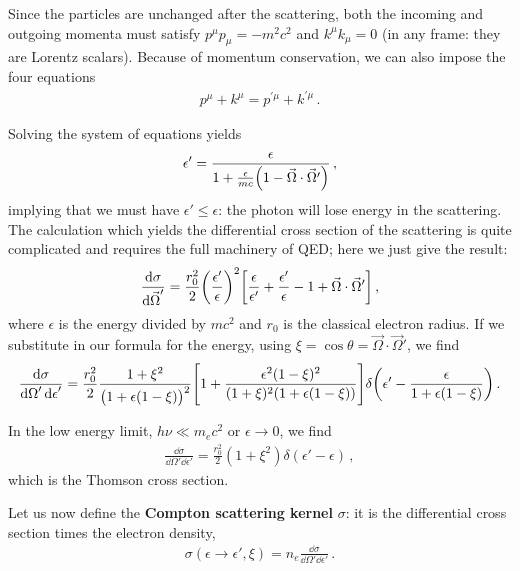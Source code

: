 \documentclass[main.tex]{subfiles}
\begin{document}
Since the particles are unchanged after the scattering, both the incoming and outgoing momenta must satisfy \(p^{\mu } p_{\mu } = - m^2 c^2\) and \(k^{\mu } k_{\mu } = 0\) (in any frame: they are Lorentz scalars). 
Because of momentum conservation, we can also impose the four equations 
%
\begin{align}
p^{\mu } + k^{\mu } = p^{\prime \mu } + k^{\prime \mu }
\,.
\end{align}

Solving the system of equations yields 
%
\begin{align}
\epsilon' = \frac{\epsilon }{1 + \frac{\epsilon }{mc} \qty(1 - \vec{\Omega} \cdot \vec{\Omega}')}
\,,
\end{align}
%
implying that we must have \(\epsilon' \leq \epsilon \): the photon will lose energy in the scattering. 
The calculation which yields the differential cross section of the scattering is quite complicated and requires the full machinery of QED; here we just give the result: 
%
\begin{align}
\frac{ \dd{\sigma }  }{ \dd{\vec{\Omega} }'} 
= \frac{r_0^2}{2 } \qty(\frac{\epsilon '}{\epsilon })^2
\qty[ \frac{\epsilon}{\epsilon '} + \frac{\epsilon'}{\epsilon } - 1 + \vec{\Omega} \cdot \vec{\Omega}'] 
\,,
\end{align}
%
where \(\epsilon \) is the energy divided by \(m c^2\) and \(r_0 \) is the classical electron radius. 
If we substitute in our formula for the energy, using \(\xi = \cos \theta = \vec{\Omega} \cdot \vec{\Omega}'\), we find 
%
\begin{align}
\frac{ \dd{\sigma }}{ \dd{\Omega }' \dd{\epsilon }'} 
= \frac{r_0^2}{2} \frac{1 + \xi^2}{\qty(1 + \epsilon (1 - \xi ))^2}
\qty[1 + \frac{\epsilon^2 (1 - \xi )^2}{(1 + \xi )^2 (1 + \epsilon (1 - \xi ))}]
\delta \qty(\epsilon ' - \frac{\epsilon }{1 + \epsilon (1 - \xi )})
\,.
\end{align}

In the low energy limit, \(h \nu \ll m_e c^2 \) or \(\epsilon \to 0\), we find 
%
\begin{align}
\frac{ \dd{\sigma }}{ \dd{\Omega }' \dd{\epsilon }'} 
=
\frac{r_0^2}{2} (1 + \xi^2) \delta (\epsilon ' - \epsilon )
\,,
\end{align}
%
which is the Thomson cross section. 

Let us now define the \textbf{Compton scattering kernel} \(\sigma \): it is the differential cross section times the electron density,
%
\begin{align}
\sigma (\epsilon \to \epsilon ', \xi ) = n_e \frac{ \dd{\sigma }}{ \dd{\Omega }' \dd{\epsilon }'}
\,.
\end{align}
\end{document}
